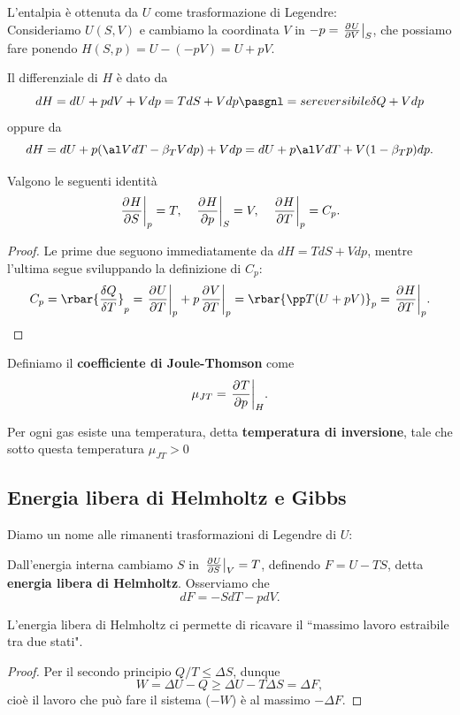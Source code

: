 \begin{remark}
L'entalpia \`e ottenuta da $U$ come trasformazione di Legendre:\\
Consideriamo $U(S,V)$ e cambiamo la coordinata $V$ in $-p=\ppb VUS$, che possiamo fare ponendo $H(S,p)=U-(-pV)=U+pV$.
\end{remark}

\begin{remark}
Il differenziale di $H$ \`e dato da
\[dH=dU+pdV+Vdp=TdS+Vdp\pasgnl={se reversibile}\delta Q+Vdp\]
oppure da
\[dH=dU+p(\al VdT-\beta_T Vdp)+Vdp=dU+p\al VdT+V(1-\beta_Tp)dp.\]
\end{remark}
\begin{corollary}
Valgono le seguenti identit\`a
\[\ppb SHp=T,\quad \ppb pHS=V,\quad \ppb THp=C_p.\]
\end{corollary}
\begin{proof}
Le prime due seguono immediatamente da $dH=TdS+Vdp$, mentre l'ultima segue sviluppando la definizione di $C_p$:
\[C_p=\rbar{\frac{\delta Q}{\delta T}}_p=\ppb TUp+p\ppb TVp=\rbar{\pp T{}(U+pV)}_p=\ppb THp.\]
\end{proof}




\begin{definition}
Definiamo il \textbf{coefficiente di Joule-Thomson} come
\[\mu_{JT}=\ppb pTH.\]
\end{definition}
\begin{fact}
Per ogni gas esiste una temperatura, detta \textbf{temperatura di inversione}, tale che sotto questa temperatura $\mu_{JT}>0$
\end{fact}




\subsection{Energia libera di Helmholtz e Gibbs}
\noindent
Diamo un nome alle rimanenti trasformazioni di Legendre di $U$:
\begin{definition}
Dall'energia interna cambiamo $S$ in $\ppb SUV=T$, definendo $F=U-TS$, detta \textbf{energia libera di Helmholtz}. Osserviamo che
\[dF=-SdT-pdV.\]
\end{definition}

\begin{remark}
L'energia libera di Helmholtz ci permette di ricavare il ``massimo lavoro estraibile tra due stati".
\end{remark}
\begin{proof}
Per il secondo principio $Q/T\leq \Delta S$, dunque
\[W=\Delta U-Q\geq \Delta U-T\Delta S=\Delta F,\]
cio\`e il lavoro che pu\`o fare il sistema ($-W$) \`e al massimo $-\Delta F$.
\end{proof}

